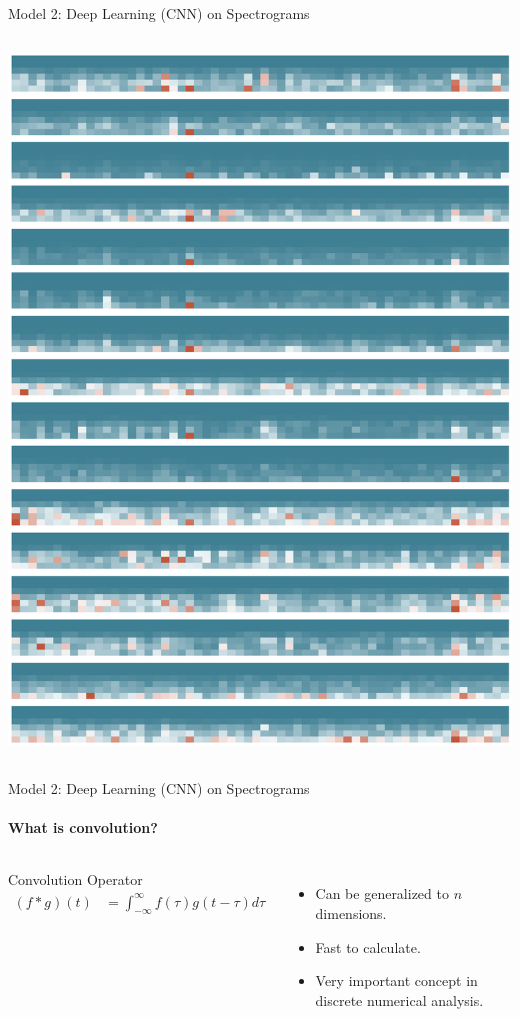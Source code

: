 \documentclass{beamer}
\begin{document}
\begin{frame}{Model 2: Deep Learning (CNN) on Spectrograms}
\begin{columns}
    \includegraphics[scale=0.22]{img/sample_p_spec.eps}
  \end{columns}

\end{frame}


\begin{frame}{Model 2: Deep Learning (CNN) on Spectrograms}
  \framesubtitle{What is convolution?}

  \begin{columns}
    \begin{block}{Convolution Operator}
      \begin{align*}
        (f * g)(t) &= \int_{-\infty}^{\infty}f(\tau) g(t - \tau) d\tau
      \end{align*}
    \end{block}
    \begin{itemize}
    \item Can be generalized to $n$ dimensions.
    \item Fast to calculate.
    \item Very important concept in discrete numerical analysis.
    \end{itemize}
  \end{columns}
\end{frame}
\end{document}
